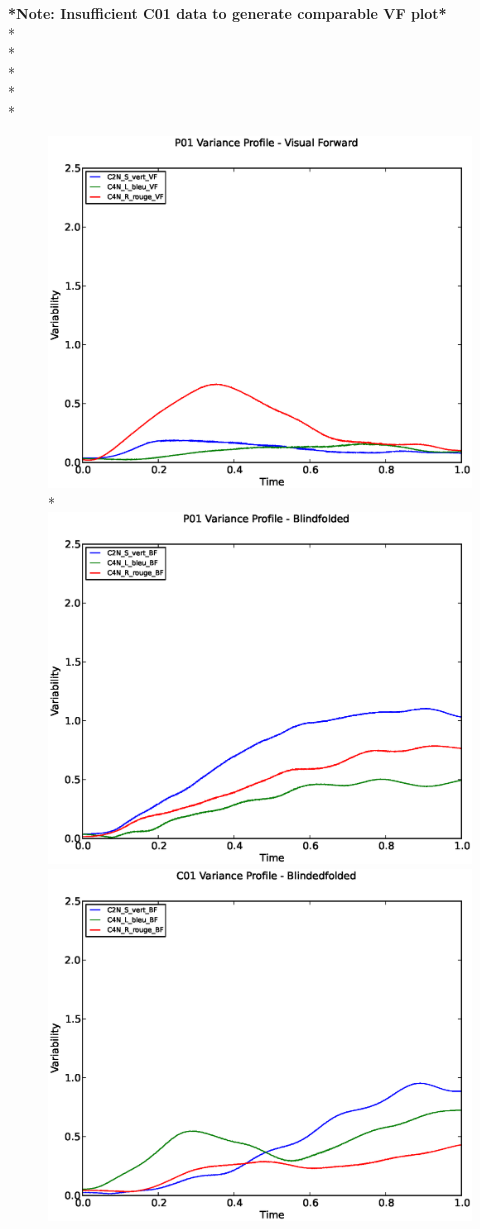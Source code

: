 \documentclass[a4page,landscape,twocolumn,10pt]{article}
\begin{document}
\newpage
\textbf{*Note: Insufficient C01 data to generate comparable VF plot*}
\\*
\\*
\\*
\\*
\\*
\begin{figure}[!htbp]
  \centering
  \includegraphics[width=0.45\linewidth]{P01_Variability_profile_VF.eps}
  \\*
  \includegraphics[width=0.45\linewidth]{P01_Variability_profile_BF.eps}
  \includegraphics[width=0.45\linewidth]{C01_Variability_profile_BF.eps}
\end{figure}

\clearpage
\end{document}
